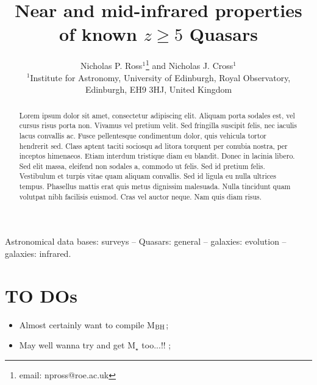 \documentclass[usenatbib]{mnras}
\begin{document}
\title[Very high-$z$ Quasars]
        {Near and mid-infrared properties of known $z\geq5$ Quasars}
\author[Ross \& Cross]
       {Nicholas P. Ross$^{1}$\thanks{email: npross@roe.ac.uk} and Nicholas J. Cross$^{1}$
\\ 
$^1$Institute for Astronomy, University of Edinburgh, Royal Observatory, Edinburgh, EH9 3HJ, United Kingdom\\
}

\maketitle
\begin{abstract}
Lorem ipsum dolor sit amet, consectetur adipiscing elit. Aliquam porta
sodales est, vel cursus risus porta non. Vivamus vel pretium
velit. Sed fringilla suscipit felis, nec iaculis lacus convallis
ac. Fusce pellentesque condimentum dolor, quis vehicula tortor
hendrerit sed. Class aptent taciti sociosqu ad litora torquent per
conubia nostra, per inceptos himenaeos. Etiam interdum tristique diam
eu blandit. Donec in lacinia libero.
Sed elit massa, eleifend non sodales a, commodo ut felis. Sed id
pretium felis. Vestibulum et turpis vitae quam aliquam convallis. Sed
id ligula eu nulla ultrices tempus. Phasellus mattis erat quis metus
dignissim malesuada. Nulla tincidunt quam volutpat nibh facilisis
euismod. Cras vel auctor neque. Nam quis diam risus.
\end{abstract}


\begin{keywords}
Astronomical data bases: surveys -- 
Quasars: general -- 
galaxies: evolution -- 
galaxies: infrared.
\end{keywords}



\section*{TO DOs}
\begin{itemize}
\item Almost certainly want to compile M$_{\rm BH}$; 
\item May well wanna try and get M$_{\star}$ too...!! ; 
\end{itemize}



\end{document}
